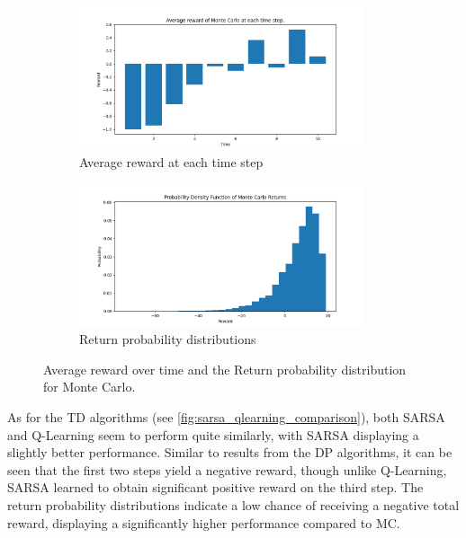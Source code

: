 \documentclass{class}
\begin{document}
\begin{figure}[H]
    \centering
    \begin{subfigure}[t]{0.47\linewidth}
        \centering
        \includegraphics[height=4.2cm]{../plots/r_over_time/monte_carlo_r_over_time.png}
        \caption{Average reward at each time step}
        \label{fig:monte_carlo_r_over_time}
    \end{subfigure}
    \begin{subfigure}[t]{0.47\linewidth}
        \centering
        \includegraphics[height=4.2cm]{../plots/return_probability/monte_carlo_return_probability.png}
        \caption{Return probability distributions}
        \label{fig:monte_carlo_return_probability}
    \end{subfigure}
    \caption{Average reward over time and the Return probability distribution for Monte Carlo.}
    \label{fig:monte_carlo_r_over_time_and_return_probability}
\end{figure}

\noindent As for the TD algorithms (see \autoref{fig:sarsa_qlearning_comparison}), both SARSA and Q-Learning seem to perform quite similarly, with SARSA displaying a slightly better performance. Similar to results from the DP algorithms, it can be seen that the first two steps yield a negative reward, though unlike Q-Learning, SARSA learned to obtain significant positive reward on the third step. The return probability distributions indicate a low chance of receiving a negative total reward, displaying a significantly higher performance compared to MC.
\end{document}
